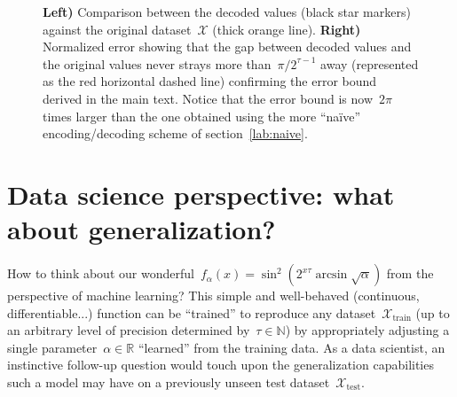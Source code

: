 \documentclass{article}
\begin{document}
\begin{figure}[hb!]
\begin{subfigure}{.48\textwidth}
\end{subfigure}
\caption{{\bf Left)} Comparison between the decoded values (black star markers) against the original dataset~$\mathcal{X}$ (thick orange line). {\bf Right)} Normalized error showing that the gap between decoded values and the original values never strays more than~$\pi/2^{\tau - 1}$ away (represented as the red horizontal dashed line) confirming the error bound derived in the main text. Notice that the error bound is now~$2\pi$ times larger than the one obtained using the more ``na\"ive'' encoding/decoding scheme of section~\ref{lab:naive}.}
\label{fig:advancedbound}
\end{figure}

\section{Data science perspective: what about generalization?}
\label{sec::generalization}

How to think about our wonderful~$f_\alpha(x) = \sin^2 \left( 2^{x\tau} \arcsin{\sqrt{\alpha}} \right)$ from the perspective of machine learning?  This simple and well-behaved (continuous, differentiable...) function can be ``trained'' to reproduce any dataset~$\mathcal{X}_\text{train}$ (up to an arbitrary level of precision determined by~$\tau \in \mathbb{N}$) by appropriately adjusting a single parameter~$\alpha \in \mathbb{R}$ ``learned'' from the training data. As a data scientist, an instinctive follow-up question would touch upon the generalization capabilities such a model may have on a previously unseen test dataset~$\mathcal{X}_\text{test}$.  \\
\end{document}
